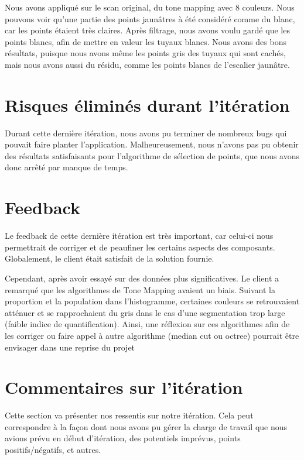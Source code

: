 \documentclass[12pt,titlepage,french]{article}
\begin{document}
Nous avons appliqué sur le scan original, du tone mapping avec 8 couleurs. Nous pouvons voir qu'une partie des points jaunâtres à été considéré comme du blanc, car les points étaient très claires. Après filtrage, nous avons voulu gardé que les points blancs, afin de mettre en valeur les tuyaux blancs. Nous avons des bons résultats, puisque nous avons même les points gris des tuyaux qui sont cachés, mais nous avons aussi du résidu, comme les points blancs de l'escalier jaunâtre.

\section{Risques éliminés durant l'itération}

Durant cette dernière itération, nous avons pu terminer de nombreux bugs qui pouvait faire planter l'application. Malheureusement, nous n'avons pas pu obtenir des résultats satisfaisants pour l'algorithme de sélection de points, que nous avons donc arrêté par manque de temps.

\section{Feedback}

Le feedback de cette dernière itération est très important, car celui-ci nous permettrait de corriger et de peaufiner les certains aspects des composants. Globalement, le client était satisfait de la solution fournie.

Cependant, après avoir essayé sur des données plus significatives.
Le client a remarqué que les algorithmes de Tone Mapping avaient un biais.
Suivant la proportion et la population dans l'histogramme, certaines couleurs se retrouvaient atténuer et se rapprochaient du gris dans le cas d'une segmentation trop large (faible indice de quantification).
Ainsi, une réflexion sur ces algorithmes afin de les corriger ou faire appel à autre algorithme (median cut ou octree) pourrait être envisager dans une reprise du projet

\section{Commentaires sur l'itération}

Cette section va présenter nos ressentis sur notre itération. Cela peut correspondre à la façon dont nous avons pu gérer la charge de travail que nous avions prévu en début d'itération, des potentiels imprévus, points positifs/négatifs, et autres.
\end{document}
